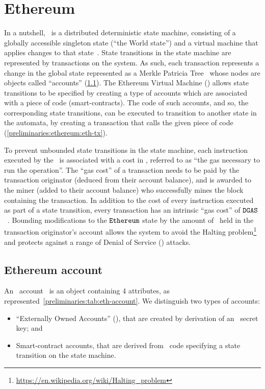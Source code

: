 
\section{Ethereum}\label{preliminaries:ethereum}

In a nutshell, \ethereum~is a distributed deterministic state machine, consisting of a globally accessible singleton state (``the World state'') and a virtual machine that applies changes to that state~\cite{mastering-eth}.
State transitions in the state machine are represented by transactions on the system. As such, each transaction represents a change in the global state represented as a Merkle Patricia Tree~\cite{patricia-tree} whose nodes are objects called ``accounts'' (\cref{preliminaries:ethereum:eth-account}). The Ethereum Virtual Machine (\evm) allows state transitions to be specified by creating a type of accounts which are associated with a piece of code (smart-contracts). The code of such accounts, and so, the corresponding state transitions, can be executed to transition to another state in the automata, by creating a transaction that calls the given piece of code (\cref{preliminaries:ethereum:eth-tx}).

To prevent unbounded state transitions in the state machine, each instruction executed by the \evm~is associated with a cost in \wei, referred to as ``the gas necessary to run the operation''. The ``gas cost'' of a transaction needs to be paid by the transaction originator (deduced from their account balance), and is awarded to the miner (added to their account balance) who successfully mines the block containing the transaction.
In addition to the cost of every instruction executed as part of a state transition, every transaction has an intrinsic ``gas cost'' of $\mathtt{DGAS}$ \wei~\cite[Appendix G]{ethyellowpaper}. Bounding modifications to the $\texttt{Ethereum}{}$ state by the amount of \wei~held in the transaction originator's account allows the system to avoid the Halting problem\footnote{\url{https://en.wikipedia.org/wiki/Halting\_problem}} and protects against a range of Denial of Service (\dos) attacks.

\subsection{Ethereum account}\label{preliminaries:ethereum:eth-account}

An \ethereum~account~\cite[Section 4.1]{ethyellowpaper} is an object containing 4 attributes, as represented~\cref{preliminaries:tab:eth-account}.
We distinguish two types of accounts:
\begin{itemize}
    \item ``Externally Owned Accounts'' (\eoa), that are created by derivation of an \ecdsa~secret key; and
    \item Smart-contract accounts, that are derived from \evm~code specifying a state transition on the state machine.
\end{itemize}

